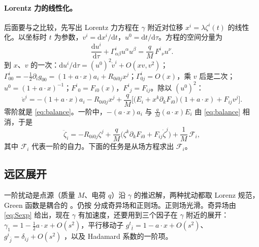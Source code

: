 \documentclass[11pt,a4paper]{ctexart}
\numberwithin{equation}{section}
\newcommand{\dd}{\mathrm d}
\begin{document}
\paragraph{Lorentz 力的线性化。}后面要与之比较，先写出 Lorentz 力方程在 $\gamma$ 附近对位移 $x^i=\lambda\zeta^i(t)$ 的线性化。以坐标时 $t$ 为参数，$v^i=\dd x^i/\dd t$，$u^0=\dd t/\dd\tau$。方程的空间分量为
\begin{equation*}
\frac{\dd u^i}{\dd\tau}+\Gamma^i_{\alpha\beta}u^\alpha u^\beta=\frac qM\,F^i{}_\nu u^\nu .
\end{equation*}
到 $x$、$v$ 的一次：$\dd u^i/\dd\tau=(u^0)^2\dot v^i+O(xv,v^2)$；$\Gamma^i_{00}=-\tfrac12\partial_ig_{00}=(1+a\cdot x)a_i+R_{0i0j}x^j$；$\Gamma^i_{0j}=O(x)$，乘 $v$ 后是二次；$u^0=(1+a\cdot x)^{-1}$；$F^i{}_0=F_{i0}(x)$，$F^i{}_j=F_{ij}$。除以 $(u^0)^2$：
\begin{equation*}
\dot v^i=-(1+a\cdot x)a_i-R_{0i0j}x^j+\frac qM\Big[\big(E_i+x^k\partial_kF_{i0}\big)(1+a\cdot x)+F_{ij}v^j\Big].
\end{equation*}
零阶就是 \eqref{eq:balance}。一阶中，$-(a\cdot x)a_i$ 与 $\tfrac qM(a\cdot x)E_i$ 由 \eqref{eq:balance} 相消，于是
\begin{equation}
\ddot\zeta_i=-R_{0i0j}\zeta^j+\frac qM\Big(\zeta^k\partial_kF_{i0}+F_{ij}\dot\zeta^j\Big)+\frac1M\,\mathcal F_i ,
\label{eq:lorentzlin}
\end{equation}
其中 $\mathcal F_i$ 代表一阶的自力。下面的任务是从场方程求出 $\mathcal F_i$。

\subsection{远区展开}
\label{sec:L4far}

一阶扰动是点源（质量 $M$、电荷 $q$）沿 $\gamma$ 的推迟解，两种扰动都取 Lorenz 规范，Green 函数是耦合的 \citep{ZimmermanPoisson2014}。仍按 \citet{DetweilerWhiting2003} 分成奇异场和正则场。正则场光滑。奇异场由 \eqref{eq:Sexp} 给出，现在 $\gamma$ 有加速度，还要用到三个因子在 $\gamma$ 附近的展开：$\gamma_1=1-\tfrac12a\cdot x+O(s^2)$，平行移动子 $g^t{}_{\bar t}=1-a\cdot x+O(s^2)$、$g^i{}_{\bar j}=\delta_{ij}+O(s^2)$ \citep{ZimmermanPoisson2014}，以及 Hadamard 系数的一阶项。
\end{document}

